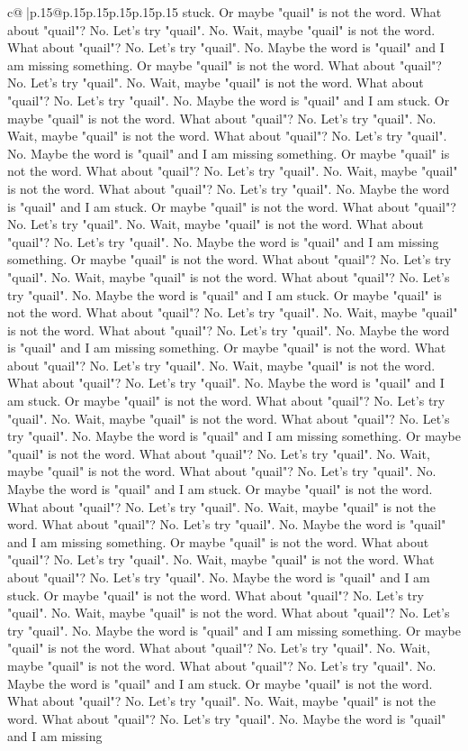 \documentclass{article}
\begin{document}
{\begin{supertabular}{c@{$\;$}|p{.15\linewidth}@{}p{.15\linewidth}p{.15\linewidth}p{.15\linewidth}p{.15\linewidth}p{.15\linewidth}}
{{{stuck. Or maybe "quail" is not the word. What about "quail"? No. Let's try "quail". No. Wait, maybe "quail" is not the word. What about "quail"? No. Let's try "quail". No. Maybe the word is "quail" and I am missing something. Or maybe "quail" is not the word. What about "quail"? No. Let's try "quail". No. Wait, maybe "quail" is not the word. What about "quail"? No. Let's try "quail". No. Maybe the word is "quail" and I am stuck. Or maybe "quail" is not the word. What about "quail"? No. Let's try "quail". No. Wait, maybe "quail" is not the word. What about "quail"? No. Let's try "quail". No. Maybe the word is "quail" and I am missing something. Or maybe "quail" is not the word. What about "quail"? No. Let's try "quail". No. Wait, maybe "quail" is not the word. What about "quail"? No. Let's try "quail". No. Maybe the word is "quail" and I am stuck. Or maybe "quail" is not the word. What about "quail"? No. Let's try "quail". No. Wait, maybe "quail" is not the word. What about "quail"? No. Let's try "quail". No. Maybe the word is "quail" and I am missing something. Or maybe "quail" is not the word. What about "quail"? No. Let's try "quail". No. Wait, maybe "quail" is not the word. What about "quail"? No. Let's try "quail". No. Maybe the word is "quail" and I am stuck. Or maybe "quail" is not the word. What about "quail"? No. Let's try "quail". No. Wait, maybe "quail" is not the word. What about "quail"? No. Let's try "quail". No. Maybe the word is "quail" and I am missing something. Or maybe "quail" is not the word. What about "quail"? No. Let's try "quail". No. Wait, maybe "quail" is not the word. What about "quail"? No. Let's try "quail". No. Maybe the word is "quail" and I am stuck. Or maybe "quail" is not the word. What about "quail"? No. Let's try "quail". No. Wait, maybe "quail" is not the word. What about "quail"? No. Let's try "quail". No. Maybe the word is "quail" and I am missing something. Or maybe "quail" is not the word. What about "quail"? No. Let's try "quail". No. Wait, maybe "quail" is not the word. What about "quail"? No. Let's try "quail". No. Maybe the word is "quail" and I am stuck. Or maybe "quail" is not the word. What about "quail"? No. Let's try "quail". No. Wait, maybe "quail" is not the word. What about "quail"? No. Let's try "quail". No. Maybe the word is "quail" and I am missing something. Or maybe "quail" is not the word. What about "quail"? No. Let's try "quail". No. Wait, maybe "quail" is not the word. What about "quail"? No. Let's try "quail". No. Maybe the word is "quail" and I am stuck. Or maybe "quail" is not the word. What about "quail"? No. Let's try "quail". No. Wait, maybe "quail" is not the word. What about "quail"? No. Let's try "quail". No. Maybe the word is "quail" and I am missing something. Or maybe "quail" is not the word. What about "quail"? No. Let's try "quail". No. Wait, maybe "quail" is not the word. What about "quail"? No. Let's try "quail". No. Maybe the word is "quail" and I am stuck. Or maybe "quail" is not the word. What about "quail"? No. Let's try "quail". No. Wait, maybe "quail" is not the word. What about "quail"? No. Let's try "quail". No. Maybe the word is "quail" and I am missing }}}
\end{supertabular}}
\end{document}
